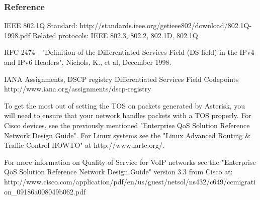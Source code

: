 \subsubsection{Reference}

IEEE 802.1Q Standard:
http://standards.ieee.org/getieee802/download/802.1Q-1998.pdf
Related protocols: IEEE 802.3, 802.2, 802.1D, 802.1Q

RFC 2474 - "Definition of the Differentiated Services Field
(DS field) in the IPv4 and IPv6 Headers", Nichols, K., et al,
December 1998.

IANA Assignments, DSCP registry
Differentiated Services Field Codepoints
http://www.iana.org/assignments/dscp-registry

To get the most out of setting the TOS on packets generated by
Asterisk, you will need to ensure that your network handles packets
with a TOS properly.  For Cisco devices, see the previously mentioned
"Enterprise QoS Solution Reference Network Design Guide".  For Linux
systems see the "Linux Advanced Routing \& Traffic Control HOWTO" at 
http://www.lartc.org/.

For more information on Quality of
Service for VoIP networks see the "Enterprise QoS Solution Reference
Network Design Guide" version 3.3 from Cisco at:
http://www.cisco.com/application/pdf/en/us/guest/netsol/ns432/c649/ccmigration\_09186a008049b062.pdf


